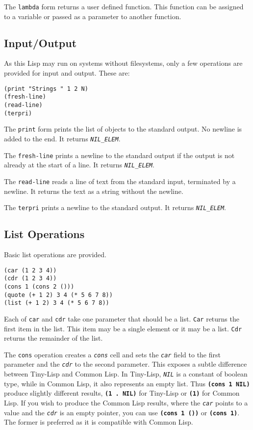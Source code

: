 \documentclass[10pt, openany]{book}
\newcommand{\operation}[1]{\textbf{\texttt{#1}}}
\newcommand{\function}[1]{\texttt{#1}}
\newcommand{\constant}[1]{\emph{\texttt{#1}}}
\newcommand{\tl}{Tiny-Lisp}
\newcommand{\cl}{Common Lisp}
\begin{document}
The \function{lambda} form returns a user defined function.  This function can be assigned to a variable or passed as a parameter to another function.

\subsection{Input/Output}
As this Lisp may run on systems without filesystems, only a few operations are provided for input and output.  These are:

\begin{lstlisting}
(print "Strings " 1 2 N)
(fresh-line)
(read-line)
(terpri)
\end{lstlisting}

The \function{print} form prints the list of objects to the standard output.  No newline is added to the end.  It returns \constant{NIL\_ELEM}.

The \function{fresh-line} prints a newline to the standard output if the output is not already at the start of a line.  It returns \constant{NIL\_ELEM}.

The \function{read-line} reads a line of text from the standard input, terminated by a newline.  It returns the text as a string without the newline.

The \function{terpri} prints a newline to the standard output.  It returns \constant{NIL\_ELEM}.

\subsection{List Operations}
Basic list operations are provided.
\begin{lstlisting}
(car (1 2 3 4))
(cdr (1 2 3 4))
(cons 1 (cons 2 ()))
(quote (+ 1 2) 3 4 (* 5 6 7 8))
(list (+ 1 2) 3 4 (* 5 6 7 8))
\end{lstlisting}

Each of \function{car} and \function{cdr} take one parameter that should be a list.  \function{Car} returns the first item in the list.  This item may be a single element or it may be a list.  \function{Cdr} returns the remainder of the list.

The \function{cons} operation creates a \constant{cons} cell and sets the \constant{car} field to the first parameter and the \constant{cdr} to the second parameter.  This exposes a subtle difference between \tl{} and \cl.  In \tl, \constant{NIL} is a constant of boolean type, while in \cl, it also represents an empty list.  Thus \operation{(cons 1 NIL)} produce slightly different results, \operation{(1 . NIL)} for \tl{} or \operation{(1)} for \cl.  If you wish to produce the \cl{} results, where the \constant{car} points to a value and the \constant{cdr} is an empty pointer, you can use \operation{(cons 1 ())} or \operation{(cons 1)}.  The former is preferred as it is compatible with \cl.
\end{document}
